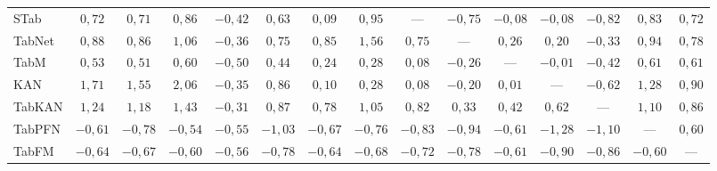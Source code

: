 \begin{table}[htbp]
\begin{tabular}{lcccccccccccccc}
STab & $0{,}72$ & $0{,}71$ & $0{,}86$ & $-0{,}42$ & $0{,}63$ & $0{,}09$ & $0{,}95$ & --- & $-0{,}75$ & $-0{,}08$ & $-0{,}08$ & $-0{,}82$ & $0{,}83$ & $0{,}72$ \\
TabNet & $0{,}88$ & $0{,}86$ & $1{,}06$ & $-0{,}36$ & $0{,}75$ & $0{,}85$ & $1{,}56$ & $0{,}75$ & --- & $0{,}26$ & $0{,}20$ & $-0{,}33$ & $0{,}94$ & $0{,}78$ \\
TabM & $0{,}53$ & $0{,}51$ & $0{,}60$ & $-0{,}50$ & $0{,}44$ & $0{,}24$ & $0{,}28$ & $0{,}08$ & $-0{,}26$ & --- & $-0{,}01$ & $-0{,}42$ & $0{,}61$ & $0{,}61$ \\
KAN & $1{,}71$ & $1{,}55$ & $2{,}06$ & $-0{,}35$ & $0{,}86$ & $0{,}10$ & $0{,}28$ & $0{,}08$ & $-0{,}20$ & $0{,}01$ & --- & $-0{,}62$ & $1{,}28$ & $0{,}90$ \\
TabKAN & $1{,}24$ & $1{,}18$ & $1{,}43$ & $-0{,}31$ & $0{,}87$ & $0{,}78$ & $1{,}05$ & $0{,}82$ & $0{,}33$ & $0{,}42$ & $0{,}62$ & --- & $1{,}10$ & $0{,}86$ \\
TabPFN & $-0{,}61$ & $-0{,}78$ & $-0{,}54$ & $-0{,}55$ & $-1{,}03$ & $-0{,}67$ & $-0{,}76$ & $-0{,}83$ & $-0{,}94$ & $-0{,}61$ & $-1{,}28$ & $-1{,}10$ & --- & $0{,}60$ \\
TabFM & $-0{,}64$ & $-0{,}67$ & $-0{,}60$ & $-0{,}56$ & $-0{,}78$ & $-0{,}64$ & $-0{,}68$ & $-0{,}72$ & $-0{,}78$ & $-0{,}61$ & $-0{,}90$ & $-0{,}86$ & $-0{,}60$ & --- \\
\bottomrule
\end{tabular}
\end{table}

